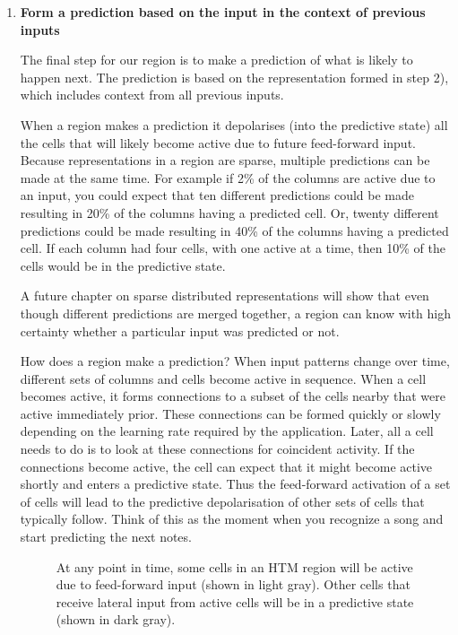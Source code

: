 \begin{enumerate}
As mentioned in the terminology section above, HTM cells can be in one
of three states. If a cell is active due to feed-forward input we just
use the term ``active.'' If the cell has high potential due to lateral
connections to other nearby cells we say it is in the ``predictive
state'' (Figure~\ref{figure:activity-types}).

\item {\bf Form a prediction based on the input in the context of
  previous inputs}

The final step for our region is to make a prediction of what is
likely to happen next. The prediction is based on the representation
formed in step 2), which includes context from all previous inputs.

When a region makes a prediction it depolarises (into the predictive
state) all the cells that will likely become active due to future
feed-forward input. Because representations in a region are sparse,
multiple predictions can be made at the same time. For example if 2\%
of the columns are active due to an input, you could expect that ten
different predictions could be made resulting in 20\% of the columns
having a predicted cell. Or, twenty different predictions could be
made resulting in 40\% of the columns having a predicted cell. If each
column had four cells, with one active at a time, then 10\% of the
cells would be in the predictive state.

A future chapter on sparse distributed representations will show that
even though different predictions are merged together, a region can
know with high certainty whether a particular input was predicted or
not.

How does a region make a prediction? When input patterns change over
time, different sets of columns and cells become active in
sequence. When a cell becomes active, it forms connections to a subset
of the cells nearby that were active immediately prior. These
connections can be formed quickly or slowly depending on the learning
rate required by the application. Later, all a cell needs to do is to
look at these connections for coincident activity. If the connections
become active, the cell can expect that it might become active shortly
and enters a predictive state. Thus the feed-forward activation of a
set of cells will lead to the predictive depolarisation of other sets of
cells that typically follow. Think of this as the moment when you
recognize a song and start predicting the next notes.

\begin{figure}
\caption{At any point in time, some cells in an HTM region will be
  active due to feed-forward input (shown in light gray). Other cells
  that receive lateral input from active cells will be in a predictive
  state (shown in dark gray).}
\label{figure:activity-types}
\end{figure}


\end{enumerate}
